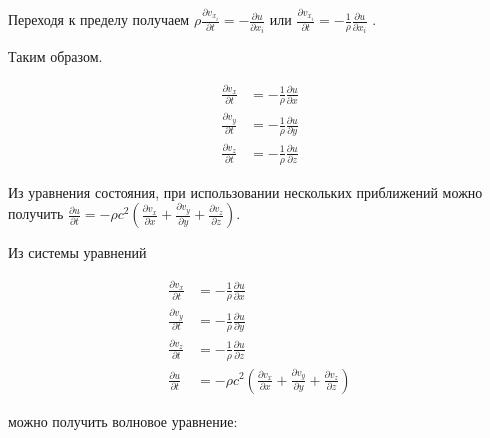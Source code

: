 Переходя к пределу получаем
\(
\rho \frac{\partial v_{x_i}}{\partial t} = - \frac{\partial u}{\partial x_i}
\)
или
\(
\frac{\partial v_{x_i}}{\partial t}
= - \frac{1}{\rho} \frac{\partial u}{\partial x_i}
\)
.

Таким образом.

\begin{align*}
    \frac{\partial v_x}{\partial t}
    &= - \frac{1}{\rho} \frac{\partial u}{\partial x}
    \\
    \frac{\partial v_y}{\partial t}
    &= - \frac{1}{\rho} \frac{\partial u}{\partial y}
    \\
    \frac{\partial v_z}{\partial t}
    &= - \frac{1}{\rho} \frac{\partial u}{\partial z}
\end{align*}

Из уравнения состояния, при использовании нескольких приближений можно получить
\(
\frac{\partial u}{\partial t}
=
-
\rho
c^2
\left(
\frac{\partial v_x}{\partial x}
+ \frac{\partial v_y}{\partial y}
+ \frac{\partial v_z}{\partial z}
\right)
\).

Из системы уравнений

\begin{align*}
    \frac{\partial v_x}{\partial t}
    &= - \frac{1}{\rho} \frac{\partial u}{\partial x}
    \\
    \frac{\partial v_y}{\partial t}
    &= - \frac{1}{\rho} \frac{\partial u}{\partial y}
    \\
    \frac{\partial v_z}{\partial t}
    &= - \frac{1}{\rho} \frac{\partial u}{\partial z}
    \\
    \frac{\partial u}{\partial t}
    &=
    -
    \rho
    c^2
    \left(
    \frac{\partial v_x}{\partial x}
    + \frac{\partial v_y}{\partial y}
    + \frac{\partial v_z}{\partial z}
    \right)
\end{align*}

можно получить волновое уравнение:

